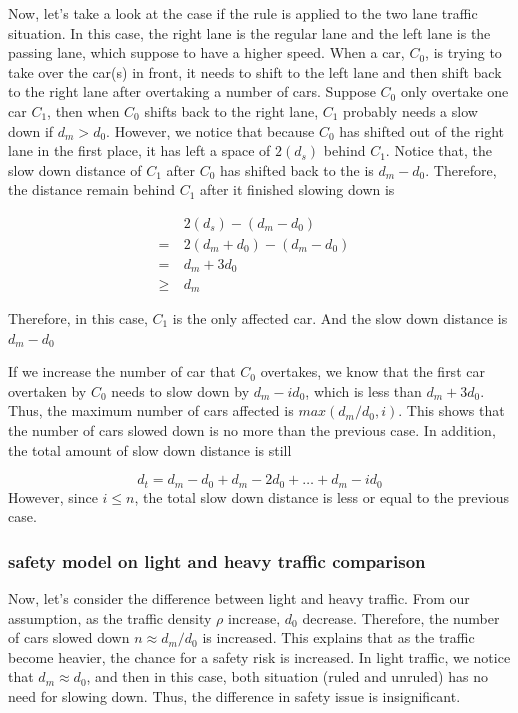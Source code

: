 Now, let's take a look at the case if the rule is applied to the two lane traffic situation. In this case, the right lane is the regular lane and the left lane is the passing lane, which suppose to have a higher speed. When a car, $C_0$, is trying to take over the car(s) in front, it needs to shift to the left lane and then shift back to the right lane after overtaking a number of cars. Suppose $C_0$ only overtake one car $C_1$, then when $C_0$ shifts back to the right lane, $C_1$ probably needs a slow down if $d_m>d_0$. However, we notice that because $C_0$ has shifted out of the right lane in the first place, it has left a space of $2(d_s)$ behind $C_1$. Notice that, the slow down distance of $C_1$ after $C_0$ has shifted back to the is $d_m-d_0$. Therefore, the distance remain behind $C_1$ after it finished slowing down is

\begin{align}
&2(d_s)-(d_m-d_0)&\\
=\ &2(d_m+d_0)-(d_m-d_0)&\\
=\ &d_m+3d_0&\\
\ge \ &d_m&
\end{align}

Therefore, in this case, $C_1$ is the only affected car. And the slow down distance is $d_m-d_0$

If we increase the number of car that $C_0$ overtakes, we know that the first car overtaken by $C_0$ needs to slow down by $d_m-id_0$, which is less than $d_m+3d_0$. Thus, the maximum number of cars affected is $max(d_m/d_0, i)$. This shows that the number of cars slowed down is no more than the previous case. In addition, the total amount of slow down distance is still

\begin{equation}
d_t = d_m-d_0 + d_m-2d_0 + \dots + d_m - id_0 
\end{equation}
However, since $i\le n$, the total slow down distance is less or equal to the previous case. 


\subsubsection{safety model on light and heavy traffic comparison}

Now, let's consider the difference between light and heavy traffic. From our assumption, as the traffic density $\rho$ increase, $d_0$ decrease. Therefore, the number of cars slowed down $n\approx d_m/d_0$ is increased. This explains that as the traffic become heavier, the chance for a safety risk is increased. In light traffic, we notice that $d_m \approx d_0$, and then in this case, both situation (ruled and unruled) has no need for slowing down. Thus, the difference in safety issue is insignificant. 
